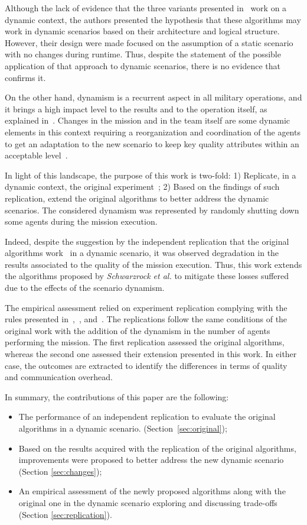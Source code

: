 Although the lack of evidence that the three variants presented in~\cite{MAS07} work on a dynamic context, the authors presented the hypothesis that these algorithms may work in dynamic scenarios based on their architecture and logical structure. However, their design were made focused on the assumption of a static scenario with no changes during runtime. Thus, despite the statement of the possible application of that approach to dynamic scenarios, there is no evidence that confirms it.

On the other hand, dynamism is a recurrent aspect in all military operations, and it brings a high impact level to the results and to the operation itself, as explained in~\cite{CC02}. Changes in the mission and in the team itself are some dynamic elements in this context requiring a reorganization and coordination of the agents to get an adaptation to the new scenario to keep key quality attributes within an acceptable level~\cite{FRANCE2014}. 

In light of this landscape, the purpose of this work is two-fold: 1) Replicate, in a dynamic context, the original experiment~\cite{MAS07}; 2) Based on the findings of such replication, extend the original algorithms to better address the dynamic scenarios. The considered dynamism was represented by randomly shutting down some agents during the mission execution.

Indeed, despite the suggestion by the independent replication that the original algorithms work~\cite{MAS07} in a dynamic scenario, it was observed degradation in the results associated to the quality of the mission execution. Thus, this work extends the algorithms proposed by \textit{Schwarzrock et al.} to mitigate these losses suffered due to the effects of the scenario dynamism.

The empirical assessment relied on experiment replication complying with the rules presented in~\cite{exp01},~\cite{exp03}, and~\cite{exp04}. The replications follow the same conditions of the original work with the addition of the dynamism in the number of agents performing the mission. The first replication assessed the original algorithms, whereas the second one assessed their extension presented in this work. In either case, the outcomes are extracted to identify the differences in terms of quality and communication overhead.

In summary, the contributions of this paper are the following:

\begin{itemize}
   \item The performance of an independent replication to evaluate the original algorithms in a dynamic scenario. (Section~\ref{sec:original});
   \item Based on the results acquired with the replication of the original algorithms, improvements were proposed to better address the new dynamic scenario (Section \ref{sec:changes});
   \item An empirical assessment of the newly proposed algorithms along with the original one in the dynamic scenario exploring and discussing trade-offs (Section \ref{sec:replication}).
\end{itemize}

